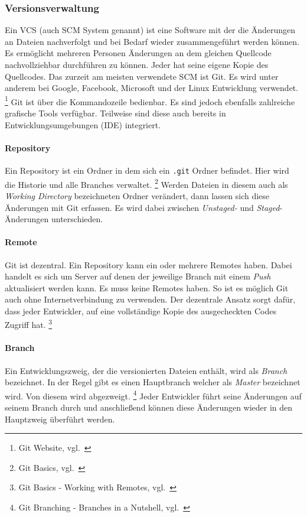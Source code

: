 \subsubsection{Versionsverwaltung}\label{vcs}

Ein VCS (auch SCM System genannt) ist eine Software mit der die Änderungen an Dateien nachverfolgt und bei Bedarf wieder zusammengeführt werden können.
Es ermöglicht mehreren Personen Änderungen an dem gleichen Quellcode nachvollziehbar durchführen zu können.
Jeder hat seine eigene Kopie des Quellcodes.
Das zurzeit am meisten verwendete SCM ist Git.
Es wird unter anderem bei Google, Facebook, Microsoft und der Linux Entwicklung verwendet. \footnote{Git Website, vgl.~\cite{GIT_SCM}}
Git ist über die Kommandozeile bedienbar.
Es sind jedoch ebenfalls zahlreiche grafische Tools verfügbar.
Teilweise sind diese auch bereits in Entwicklungsumgebungen (IDE) integriert.

\paragraph{Repository}

Ein Repository ist ein Ordner in dem sich ein \texttt{.git} Ordner befindet.
Hier wird die Historie und alle Branches verwaltet. \footnote{Git Basics, vgl.~\cite{GIT_SCM_BASICS}}
Werden Dateien in diesem auch als \textsl{Working Directory} bezeichneten Ordner verändert, dann lassen sich diese Änderungen mit Git erfassen.
Es wird dabei zwischen \textsl{Unstaged-} und \textsl{Staged}-Änderungen unterschieden.

\paragraph{Remote}

Git ist dezentral.
Ein Repository kann ein oder mehrere Remotes haben.
Dabei handelt es sich um Server auf denen der jeweilige Branch mit einem \textsl{Push} aktualisiert werden kann.
Es muss keine Remotes haben.
So ist es möglich Git auch ohne Internetverbindung zu verwenden.
Der dezentrale Ansatz sorgt dafür, dass jeder Entwickler, auf eine vollständige Kopie des ausgecheckten Codes Zugriff hat.
\footnote{Git Basics - Working with Remotes, vgl.~\cite{GIT_SCM_REMOTES}}

\paragraph{Branch}

Ein Entwicklungszweig, der die versionierten Dateien enthält, wird als \textsl{Branch} bezeichnet.
In der Regel gibt es einen Hauptbranch welcher als \textsl{Master} bezeichnet wird.
Von diesem wird abgezweigt. \footnote{Git Branching - Branches in a Nutshell, vgl.~\cite{GIT_SCM_BRANCHING}}
Jeder Entwickler führt seine Änderungen auf seinem Branch durch und anschließend können diese Änderungen wieder in den Hauptzweig überführt werden.

